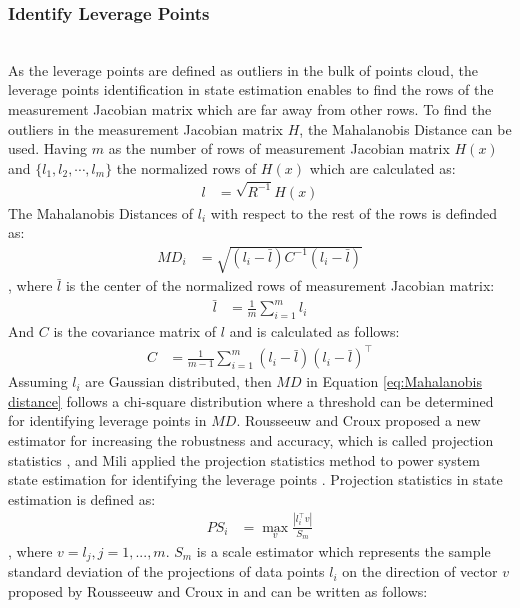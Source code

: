 \subsubsection{Identify Leverage Points}
\\As the leverage points are defined as outliers in the bulk of points cloud, the leverage points identification in state estimation enables to find the rows of the measurement Jacobian matrix which are far away from other rows. To find the outliers in the measurement Jacobian matrix $H$, the Mahalanobis Distance can be used. Having $m$ as the number of rows of measurement Jacobian matrix $H(x)$ and $\{ l_1,l_2,\cdots,l_m \}$ the normalized rows of $H(x)$ which are calculated as:
\begin{align}
    l &= \sqrt{R^{-1}} H(x)
    \label{eq:normalized jacobian matrix l}
\end{align}
The Mahalanobis Distances of $l_i$ with respect to the rest of the rows is definded as:
\begin{align}
    MD_i &= \sqrt{(l_i-\bar{l})C^{-1}(l_i-\bar{l})}
    \label{eq:Mahalanobis distance}
\end{align}
, where $\bar{l}$ is the center of the normalized rows of measurement Jacobian matrix:
\begin{align}
    \bar{l} &= \frac{1}{m} \sum_{i=1}^{m} l_i
    \label{eq:center of l}
\end{align}
And $C$ is the covariance matrix of $l$ and is calculated as follows:
\begin{align}
    C &= \frac{1}{m-1} \sum_{i=1}^{m} (l_i-\bar{l}) (l_i-\bar{l})^\intercal 
    \label{eq:covar of l}
\end{align}
Assuming $l_i$ are Gaussian distributed, then $MD$ in Equation \ref{eq:Mahalanobis distance} follows a chi-square distribution where a threshold can be determined for identifying leverage points in $MD$. Rousseeuw and Croux proposed a new estimator for increasing the robustness and accuracy, which is called projection statistics \cite{rousseeuw1993alternatives}, and Mili applied the projection statistics method to power system state estimation for identifying the leverage points \cite{mili1996robust}. Projection statistics in state estimation is defined as:
\begin{align}
    PS_i &= \max _{v} \frac{|l_i^{\intercal}v|}{S_m}
    \label{eq:projection statistics}
\end{align}
, where $v=l_j, j=1,...,m$. $S_m$ is a scale estimator which represents the sample standard deviation of the projections of data points $l_i$ on the direction of vector $v$ proposed by Rousseeuw and Croux in \cite{croux1992time} and can be written as follows:
